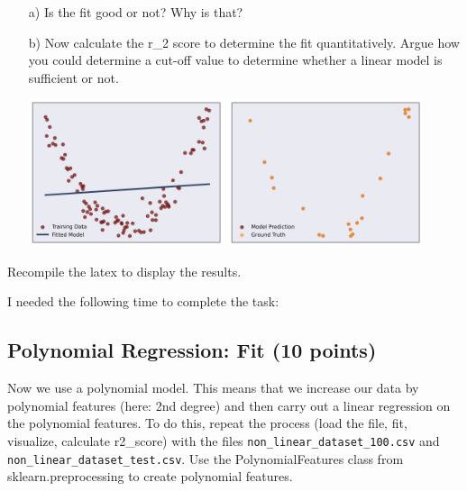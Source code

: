 \begin{enumerate}

\item[a)] Is the fit good or not? Why is that? 

\item[b)] Now calculate the r\_2 score to determine the fit quantitatively. Argue how you could determine a cut-off value to determine whether a linear model is sufficient or not.

\includegraphics[width=0.45\textwidth]{source_code/underfit_linear_model.png}
\includegraphics[width=0.45\textwidth]{source_code/underfit_linear_testdata.png}

\end{enumerate}

Recompile the latex to display the results.

I needed the following time to complete the task:

\subsection{Polynomial Regression: Fit (10 points)}

Now we use a polynomial model. This means that we increase our data by polynomial features (here: 2nd degree) and then carry out a linear regression on the
polynomial features. To do this, repeat the process (load the file, fit, visualize, calculate r2\_score) with the files \texttt{non\_linear\_dataset\_100.csv} and \texttt{non\_linear\_dataset\_test.csv}.
Use the PolynomialFeatures class from sklearn.preprocessing to create polynomial features. 

